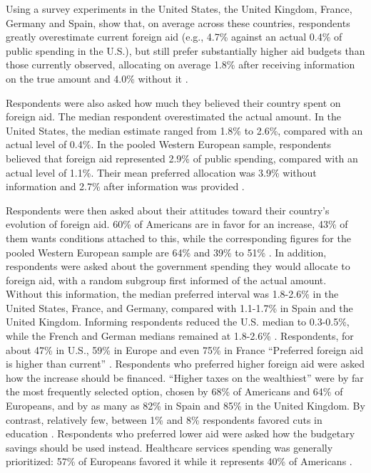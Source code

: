 Using a survey experiments in the United States, the United Kingdom, France, Germany and Spain, \citet{fabre_majority_2025} show that, on average across these countries,
respondents greatly overestimate current foreign aid (e.g., 4.7\% against an actual 0.4\% of public spending in the U.S.), but still prefer substantially higher aid budgets than those currently observed, allocating on average 1.8\% after receiving information on the true amount and 4.0\% without it \citet[Figure 8]{fabre_majority_2025_si}.

Respondents were also asked how much they believed their country spent on foreign aid. The median respondent overestimated the actual amount. In the United States, the median estimate ranged from 1.8\% to 2.6\%, compared with an actual level of 0.4\%. In the pooled Western European sample, respondents believed that foreign aid represented 2.9\% of public spending, compared with an actual level of 1.1\%. Their mean preferred allocation was 3.9\% without information and 2.7\% after information was provided \citep[Figure S20]{fabre_majority_2025_si}.


Respondents were then asked about their attitudes toward their country's evolution of foreign aid. 60\% of Americans are in favor for an increase, 43\% of them wants conditions attached to this, while the corresponding figures for the pooled Western European sample are 64\% and 39\% to 51\% \citep[Figure 6]{fabre_majority_2025_si}. In addition, respondents were asked about the government spending they would allocate to foreign aid, with a random subgroup first informed of the actual amount. Without this information, the median preferred interval was 1.8-2.6\% in the United States, France, and Germany, compared with 1.1-1.7\% in Spain and the United Kingdom. Informing respondents reduced the U.S. median to 0.3-0.5\%, while the French and German medians remained at 1.8-2.6\% \citep[Figure S20-S21]{fabre_majority_2025_si}. Respondents, for about 47\% in U.S., 59\% in Europe and even 75\% in France ``Preferred foreign aid is higher than current'' \citep[Figure S23]{fabre_majority_2025_si}. Respondents who preferred higher foreign aid were asked how the increase should be financed. ``Higher taxes on the wealthiest'' were by far the most frequently selected option, chosen by 68\% of Americans and 64\% of Europeans, and by as many as 82\% in Spain and 85\% in the United Kingdom. By contrast, relatively few, between 1\% and 8\% respondents favored cuts in education \citep[Figure S24]{fabre_majority_2025_si}. Respondents who preferred lower aid were asked how the budgetary savings should be used instead. Healthcare services spending was generally prioritized: 57\% of Europeans favored it while it represents 40\% of Americans \citep[Figure S25]{fabre_majority_2025_si}.


